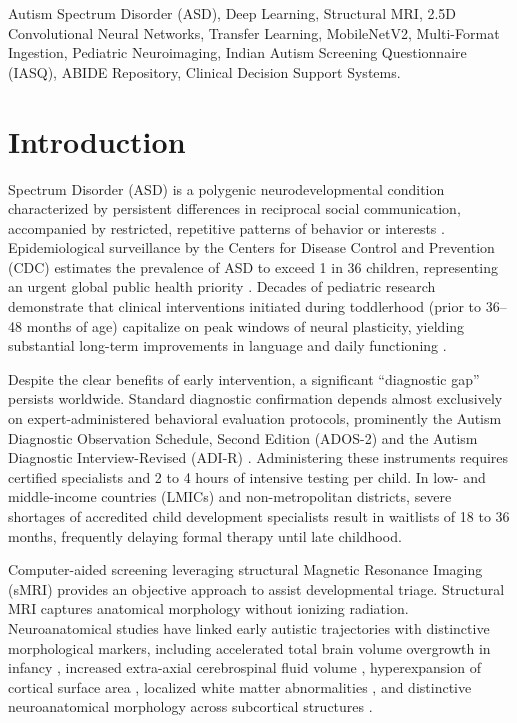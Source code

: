 \documentclass[conference]{IEEEtran}
\begin{document}
\begin{IEEEkeywords}
Autism Spectrum Disorder (ASD), Deep Learning, Structural MRI, 2.5D Convolutional Neural Networks, Transfer Learning, MobileNetV2, Multi-Format Ingestion, Pediatric Neuroimaging, Indian Autism Screening Questionnaire (IASQ), ABIDE Repository, Clinical Decision Support Systems.
\end{IEEEkeywords}

\section{Introduction}
 Spectrum Disorder (ASD) is a polygenic neurodevelopmental condition characterized by persistent differences in reciprocal social communication, accompanied by restricted, repetitive patterns of behavior or interests \cite{american2022dsm5}. Epidemiological surveillance by the Centers for Disease Control and Prevention (CDC) estimates the prevalence of ASD to exceed 1 in 36 children, representing an urgent global public health priority \cite{maenner2023prevalence}. Decades of pediatric research demonstrate that clinical interventions initiated during toddlerhood (prior to 36--48 months of age) capitalize on peak windows of neural plasticity, yielding substantial long-term improvements in language and daily functioning \cite{dawson2010randomized}.

Despite the clear benefits of early intervention, a significant ``diagnostic gap'' persists worldwide. Standard diagnostic confirmation depends almost exclusively on expert-administered behavioral evaluation protocols, prominently the Autism Diagnostic Observation Schedule, Second Edition (ADOS-2) and the Autism Diagnostic Interview-Revised (ADI-R) \cite{lord2000autism}. Administering these instruments requires certified specialists and 2 to 4 hours of intensive testing per child. In low- and middle-income countries (LMICs) and non-metropolitan districts, severe shortages of accredited child development specialists result in waitlists of 18 to 36 months, frequently delaying formal therapy until late childhood.

Computer-aided screening leveraging structural Magnetic Resonance Imaging (sMRI) provides an objective approach to assist developmental triage. Structural MRI captures anatomical morphology without ionizing radiation. Neuroanatomical studies have linked early autistic trajectories with distinctive morphological markers, including accelerated total brain volume overgrowth in infancy \cite{courchesne2001unusual}, increased extra-axial cerebrospinal fluid volume \cite{shen2013early}, hyperexpansion of cortical surface area \cite{hazlett2017early}, localized white matter abnormalities \cite{herbert2004localization}, and distinctive neuroanatomical morphology across subcortical structures \cite{amaral2008neuroanatomy, ecker2010investigating}.
\end{document}
